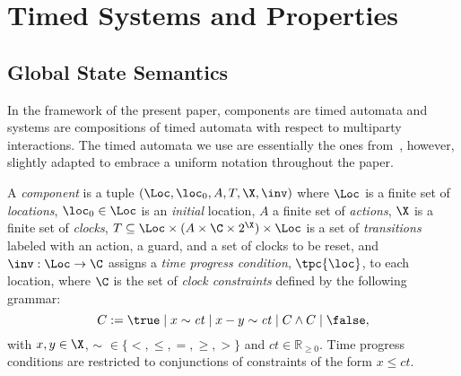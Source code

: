 \section{Timed Systems and Properties}
\label{sec:ts}

\subsection{Global State Semantics}

In the framework of the present paper, components are timed automata
and systems are compositions of timed automata with respect to
multiparty interactions. The timed automata we use are essentially
the ones from~\cite{alur94}, however, slightly adapted to embrace a
uniform notation throughout the paper.

\begin{definition}[Component]
  \label{def:atom}
  A \emph{component} is a tuple
  $(\Loc, \loc_0, A, T, \X, \inv)$ where
  $\Loc$ is a finite set of \emph{locations}, $\loc_0 \in \Loc$ is an \emph{initial} location, $A$
  a finite set of \emph{actions}, $\X$ is a finite set of
  \emph{clocks}, $T \subseteq \Loc\times(A\times \C
  \times 2^{\X})\times \Loc$ is a set of \emph{transitions} labeled with an action, a
  guard, and a set of clocks to be reset,
    and $\inv: \Loc\rightarrow\C$ assigns a \emph{time
    progress condition}, $\tpc{\loc}$,
    to each location, where $\C$ is the set of \emph{clock
  constraints} defined by the following grammar: 
  \begin{displaymath} 
  C := \true \mid x\sim\mathit{ct} \mid x - y \sim\mathit{ct} \mid C 
\wedge C\mid\false, 
\end{displaymath}
  with $x, y\in \X$, $\sim$ $\in\{<,\le,=,\ge,>\}$ and $\mathit{ct} \in
  \mathbb{R}_{\ge 0}$.
 Time progress conditions are restricted to conjunctions of
  constraints of the form $x \leq \mathit{ct}$.
\end{definition}

